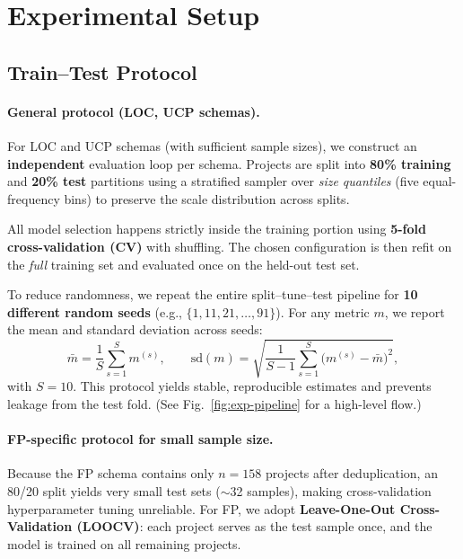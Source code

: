 \documentclass{ieeeaccess}
\begin{document}

\section{Experimental Setup}
\label{sec:exp-setup}


\subsection{Train--Test Protocol}

\paragraph{General protocol (LOC, UCP schemas).}
For LOC and UCP schemas (with sufficient sample sizes), 
we construct an \textbf{independent} evaluation loop per schema. 
Projects are split into \textbf{80\% training} and \textbf{20\% test} partitions 
using a stratified sampler over \emph{size quantiles} (five equal-frequency bins) 
to preserve the scale distribution across splits. 

All model selection happens strictly inside the training portion using 
\textbf{5-fold cross-validation (CV)} with shuffling. 
The chosen configuration is then refit on the \emph{full} training set 
and evaluated once on the held-out test set.

To reduce randomness, we repeat the entire split--tune--test pipeline 
for \textbf{10 different random seeds} 
(e.g., $\{1, 11, 21, \ldots, 91\}$). 
For any metric $m$, we report the mean and standard deviation across seeds:
\[
\bar{m}=\frac{1}{S}\sum_{s=1}^{S} m^{(s)},\qquad
\mathrm{sd}(m)=\sqrt{\frac{1}{S-1}\sum_{s=1}^{S}\!\bigl(m^{(s)}-\bar{m}\bigr)^2},
\]
with $S{=}10$. 
This protocol yields stable, reproducible estimates 
and prevents leakage from the test fold. 
(See Fig.~\ref{fig:exp-pipeline} for a high-level flow.)

\paragraph{FP-specific protocol for small sample size.}
Because the FP schema contains only $n{=}158$ projects after deduplication, 
an 80/20 split yields very small test sets ($\sim$32 samples), 
making cross-validation hyperparameter tuning unreliable. 
For FP, we adopt \textbf{Leave-One-Out Cross-Validation (LOOCV)}: 
each project serves as the test sample once, and the model is trained on all remaining projects.
\end{document}
